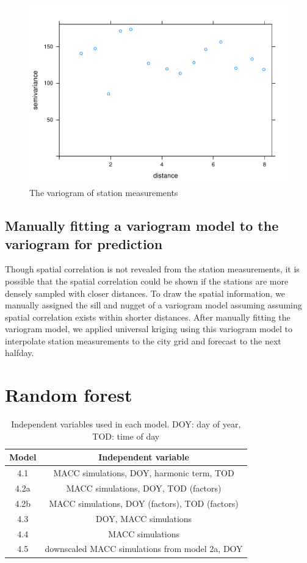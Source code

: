 \documentclass{article}
\begin{document}
\begin{figure}[tbp]
  \center
\includegraphics[scale = 0.4]{variogram.pdf}
\caption{The variogram of station measurements }
\label{fig:variogram}
\end{figure}




\subsection{Manually fitting a variogram model to the variogram for prediction}

Though spatial correlation is not revealed from the station measurements, it is possible that the spatial correlation could be shown if the stations are more densely sampled with closer distances. To draw the spatial information, we manually assigned the sill and
nugget of a variogram model assuming assuming spatial correlation exists within shorter distances. 
After manually fitting the variogram model, we applied universal kriging using this variogram model to interpolate station measurements to the city grid and forecast to the next halfday.



\section{Random forest}
\label{sec:rf}

\begin{table}[tbp]
\centering
\begin{tabular}{ c c  }
Model &  Independent variable\\ \hline 

 4.1 & MACC simulations, DOY, harmonic term, TOD \\
 4.2a & MACC simulations, DOY, TOD (factors) \\
 4.2b & MACC simulations, DOY (factors), TOD (factors) \\ 
 4.3 & DOY, MACC simulations \\
 4.4 & MACC simulations  \\  
 4.5 & downscaled MACC simulations from model 2a, DOY \\ \hline
\end{tabular}
\caption{Independent variables used in each model. DOY: day of year, TOD: time of day  } 
\label{table:rf}
\end{table}
\end{document}
